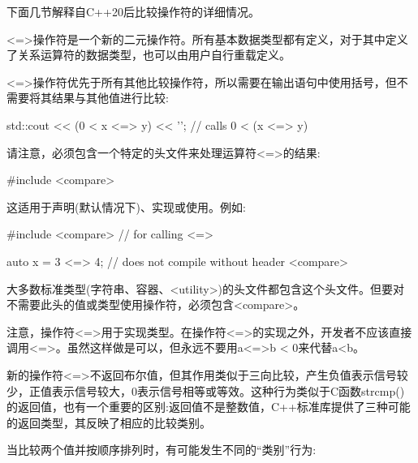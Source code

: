 下面几节解释自C++20后比较操作符的详细情况。


<=>操作符是一个新的二元操作符。所有基本数据类型都有定义，对于其中定义了关系运算符的数据类型，也可以由用户自行重载定义。

<=>操作符优先于所有其他比较操作符，所以需要在输出语句中使用括号，但不需要将其结果与其他值进行比较:

\begin{cpp}
std::cout << (0 < x <=> y) << '\n'; // calls 0 < (x <=> y)
\end{cpp}

请注意，必须包含一个特定的头文件来处理运算符<=>的结果:

\begin{cpp}
#include <compare>
\end{cpp}

这适用于声明(默认情况下)、实现或使用。例如:

\begin{cpp}
#include <compare> // for calling <=>

auto x = 3 <=> 4; // does not compile without header <compare>
\end{cpp}

大多数标准类型(字符串、容器、<utility>)的头文件都包含这个头文件。但要对不需要此头的值或类型使用操作符，必须包含<compare>。

注意，操作符<=>用于实现类型。在操作符<=>的实现之外，开发者不应该直接调用<=>。虽然这样做是可以，但永远不要用a<=>b < 0来代替a<b。


新的操作符<=>不返回布尔值，但其作用类似于三向比较，产生负值表示信号较少，正值表示信号较大，0表示信号相等或等效。这种行为类似于C函数strcmp()的返回值，也有一个重要的区别:返回值不是整数值，C++标准库提供了三种可能的返回类型，其反映了相应的比较类别。


当比较两个值并按顺序排列时，有可能发生不同的“类别”行为:

